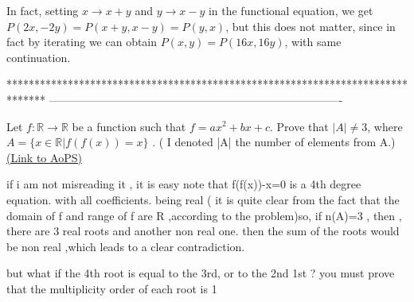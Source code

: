 \begin{solution}
	In fact, setting $x\to x+y$ and $y\to x-y$ in the functional equation, we get $P(2x,-2y)=P(x+y,x-y)=P(y,x)$, but this does not matter, since in fact by iterating we can obtain $P(x,y) = P(16x,16y)$, with same continuation.
\end{solution}
*******************************************************************************
-------------------------------------------------------------------------------

\begin{problem}
	Let $ f:\mathbb{R} \rightarrow \mathbb{R}$ be a function such that $f=ax^2+bx+c$. Prove that  $|A| \neq 3 $, where $A =\{x\in\mathbb{R} | f(f(x))=x\}$ . ( I denoted |A| the number of elements from A.)
	\flushright \href{https://artofproblemsolving.com/community/c6h478974}{(Link to AoPS)}
\end{problem}



\begin{solution}
	if i am not misreading it , it is easy
note that f(f(x))-x=0 is a 4th degree equation. with all coefficients. being real ( it is quite clear from the fact that the domain of f and range of f are R ,according to the problem)so, if n(A)=3 , then , there are 3 real roots and another non real one. then the sum of the roots would be non real ,which leads to a clear contradiction. 
\end{solution}



\begin{solution}
	but what if the 4th root is equal to the 3rd, or to the 2nd\/ 1st ?
you must prove that the multiplicity order of each root is 1
\end{solution}



